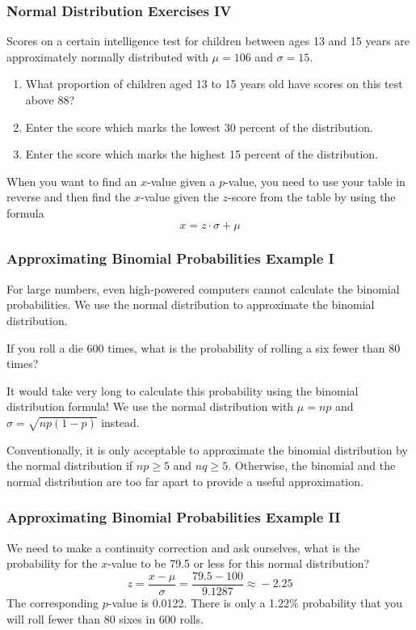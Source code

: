 \documentclass[xcolor=dvipsnames]{beamer}
\begin{document}
\begin{frame}
  \frametitle{Normal Distribution Exercises IV}
  {\ubung} Scores on a certain intelligence test for children between
  ages 13 and 15 years are approximately normally distributed with
  $\mu=106$ and $\sigma=15$.
  \begin{enumerate}
  \item What proportion of children aged 13 to 15 years old have
    scores on this test above 88?
  \item Enter the score which marks the lowest 30 percent of the
    distribution.
  \item Enter the score which marks the highest 15 percent of the
    distribution.
  \end{enumerate}
When you want to find an $x$-value given a $p$-value, you need to use
your table in reverse and then find the $x$-value given the $z$-score
from the table by using the formula
\begin{equation}
  \label{eq:aedecaba}
  x=z\cdot\sigma+\mu
\end{equation}
\end{frame}

\begin{frame}
  \frametitle{Approximating Binomial Probabilities Example I}
  For large numbers, even high-powered computers cannot calculate the
  binomial probabilities. We use the normal distribution to
  approximate the binomial distribution. 

\bigskip

   If you roll a die 600 times, what is the
  probability of rolling a six fewer than 80 times? 

\bigskip

  It would take very long to calculate this probability using the
  binomial distribution formula! We use the normal distribution with
  $\mu=np$ and $\sigma=\sqrt{np(1-p)}$ instead. 

\bigskip

  Conventionally, it is only acceptable to approximate the binomial
  distribution by the normal distribution if $np\geq{}5$ and
  $nq\geq{}5$. Otherwise, the binomial and the normal distribution are
  too far apart to provide a useful approximation.
\end{frame}

\begin{frame}
  \frametitle{Approximating Binomial Probabilities Example II}
  We need to make a \alert{continuity correction} and ask ourselves,
  what is the probability for the $x$-value to be 79.5 or less for
  this normal distribution?
  \begin{equation}
    \label{eq:oolojuth}
    z=\frac{x-\mu}{\sigma}=\frac{79.5-100}{9.1287}\approx{}-2.25
  \end{equation}
  The corresponding $p$-value is 0.0122. There is only a 1.22\%
  probability that you will roll fewer than 80 sixes in 600 rolls.
\end{frame}
\end{document}
